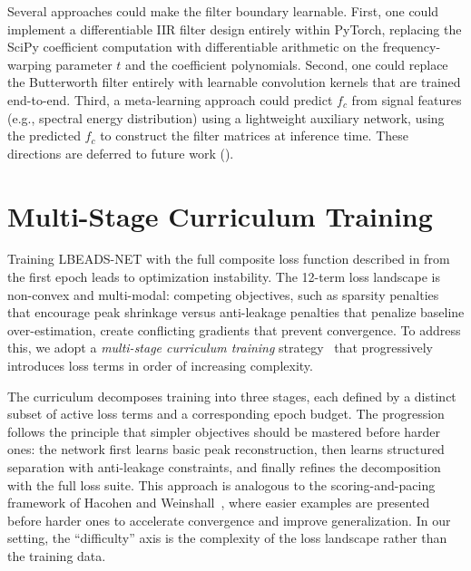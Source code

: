 Several approaches could make the filter boundary learnable. First, one could implement a differentiable IIR filter design entirely within PyTorch, replacing the SciPy coefficient computation with differentiable arithmetic on the frequency-warping parameter $t$ and the coefficient polynomials. Second, one could replace the Butterworth filter entirely with learnable convolution kernels that are trained end-to-end. Third, a meta-learning approach could predict $f_c$ from signal features (e.g., spectral energy distribution) using a lightweight auxiliary network, using the predicted $f_c$ to construct the filter matrices at inference time. These directions are deferred to future work ().


\section{Multi-Stage Curriculum Training}
\label{sec:method_curriculum}

Training LBEADS-NET with the full composite loss function described in  from the first epoch leads to optimization instability. The 12-term loss landscape is non-convex and multi-modal: competing objectives, such as sparsity penalties that encourage peak shrinkage versus anti-leakage penalties that penalize baseline over-estimation, create conflicting gradients that prevent convergence. To address this, we adopt a \emph{multi-stage curriculum training} strategy~\cite{hacohen2019curriculum} that progressively introduces loss terms in order of increasing complexity.

The curriculum decomposes training into three stages, each defined by a distinct subset of active loss terms and a corresponding epoch budget. The progression follows the principle that simpler objectives should be mastered before harder ones: the network first learns basic peak reconstruction, then learns structured separation with anti-leakage constraints, and finally refines the decomposition with the full loss suite. This approach is analogous to the scoring-and-pacing framework of Hacohen and Weinshall~\cite{hacohen2019curriculum}, where easier examples are presented before harder ones to accelerate convergence and improve generalization. In our setting, the ``difficulty'' axis is the complexity of the loss landscape rather than the training data.


